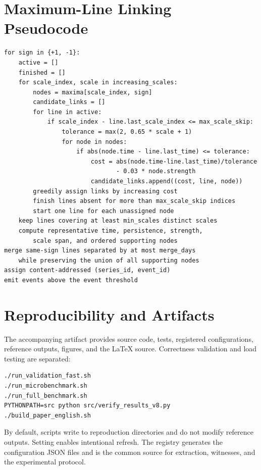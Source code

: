 \appendix

\section{Maximum-Line Linking Pseudocode}

\begin{lstlisting}[language={},basicstyle=\ttfamily\footnotesize]
for sign in {+1, -1}:
    active = []
    finished = []
    for scale_index, scale in increasing_scales:
        nodes = maxima[scale_index, sign]
        candidate_links = []
        for line in active:
            if scale_index - line.last_scale_index <= max_scale_skip:
                tolerance = max(2, 0.65 * scale + 1)
                for node in nodes:
                    if abs(node.time - line.last_time) <= tolerance:
                        cost = abs(node.time-line.last_time)/tolerance
                               - 0.03 * node.strength
                        candidate_links.append((cost, line, node))
        greedily assign links by increasing cost
        finish lines absent for more than max_scale_skip indices
        start one line for each unassigned node
    keep lines covering at least min_scales distinct scales
    compute representative time, persistence, strength,
        scale span, and ordered supporting nodes
merge same-sign lines separated by at most merge_days
    while preserving the union of all supporting nodes
assign content-addressed (series_id, event_id)
emit events above the event threshold
\end{lstlisting}

\section{Reproducibility and Artifacts}

The accompanying artifact provides source code, tests, registered configurations, reference outputs, figures, and the \LaTeX{} source. Correctness validation and load testing are separated:
\begin{lstlisting}[language={},basicstyle=\ttfamily\footnotesize]
./run_validation_fast.sh
./run_microbenchmark.sh
./run_full_benchmark.sh
PYTHONPATH=src python src/verify_results_v8.py
./build_paper_english.sh
\end{lstlisting}
By default, scripts write to reproduction directories and do not modify reference outputs. Setting  enables intentional refresh. The  registry generates the configuration JSON files and is the common source for extraction, witnesses, and the experimental protocol.

